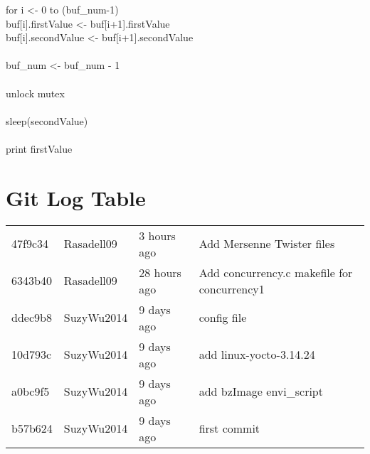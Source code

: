 \documentclass[letterpaper,10pt,titlepage]{article}
\begin{document}
\begin{tabbing}
        \>\>for i \textless- 0 to (buf\_num-1) \\
            \>\>\>buf[i].firstValue \textless- buf[i+1].firstValue \\
            \>\>\>buf[i].secondValue \textless- buf[i+1].secondValue \\
            \\
        \>\>buf\_num \textless- buf\_num - 1 \\
            \\
        \>\>unlock mutex \\
            \\
        \>\>sleep(secondValue) \\
            \\
        \>\>print firstValue \\
\end{tabbing}

\section{Git Log Table}
\begin{table}[h]
\begin{tabular}{llll}
47f9c34 & Rasadell09 & 3 hours ago  & Add Mersenne Twister files                  \\
6343b40 & Rasadell09 & 28 hours ago & Add concurrency.c makefile for concurrency1 \\
ddec9b8 & SuzyWu2014 & 9 days ago   & config file                                 \\
10d793c & SuzyWu2014 & 9 days ago   & add linux-yocto-3.14.24                     \\
a0bc9f5 & SuzyWu2014 & 9 days ago   & add bzImage envi\_script                    \\
b57b624 & SuzyWu2014 & 9 days ago   & first commit                               
\end{tabular}
\end{table}
\end{document}
